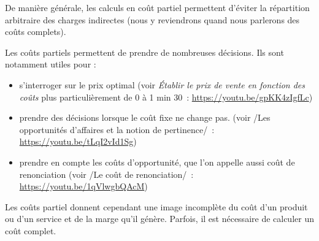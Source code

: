 \documentclass[oneside]{kaobook}
\begin{document}
De manière générale, les calculs en coût partiel permettent d'éviter la répartition arbitraire des charges indirectes (nous y reviendrons quand nous parlerons des coûts complets). 
\begin{kaobox}
Les coûts partiels permettent de prendre de nombreuses décisions. Ils sont notamment utiles pour :
\begin{itemize}
\item s'interroger sur le prix optimal (voir \emph{Établir le prix de vente en fonction des coûts} plus particulièrement de 0 à 1 min 30 : \url{https://youtu.be/gpKK4zIgfLc})
\item prendre des décisions lorsque le coût fixe ne change pas. (voir /Les opportunités d'affaires et la notion de pertinence/ : \url{https://youtu.be/tLqI2vId1Sg})
\item prendre en compte les coûts d'opportunité, que l'on appelle aussi coût de renonciation (voir /Le coût de renonciation/ : \url{https://youtu.be/1qVlwgbQAcM})
\end{itemize}
\end{kaobox}
Les coûts partiel donnent cependant une image incomplète du coût d'un produit ou d'un service et de la marge qu'il génère. Parfois, il est nécessaire de calculer un coût complet. 
\end{document}
